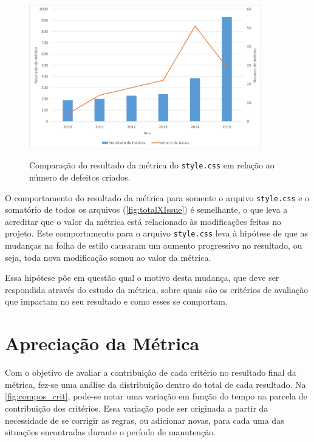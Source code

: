 \begin{figure}[!htb]
	\centering
	\caption{Comparação do resultado da métrica do \texttt{style.css} em relação ao número de defeitos criados.}
	\includegraphics[width=0.9\textwidth]{./04-figuras/style_issues}
	\label{fig:styleXIssues}
\end{figure}

O comportamento do resultado da métrica para somente o arquivo \texttt{style.css} e o somatório de todos os arquivos (\autoref{fig:totalXIssue}) é semelhante, o que leva a acreditar que o valor da métrica está relacionado às modificações feitas no projeto. Este comportamento para o arquivo \texttt{style.css} leva à hipótese de que as mudanças na folha de estilo causaram um aumento progressivo no resultado, ou seja, toda nova modificação somou ao valor da métrica.

Essa hipótese põe em questão qual o motivo desta mudança, que deve ser respondida através do estudo da métrica, sobre quais são os critérios de avaliação que impactam no seu resultado e como esses se comportam. 

\section{Apreciação da Métrica}

Com o objetivo de avaliar a contribuição de cada critério no resultado final da métrica, fez-se uma análise da distribuição dentro do total de cada resultado. Na \autoref{fig:compos_crit}, pode-se notar uma variação em função do tempo na parcela de contribuição dos critérios. Essa variação pode ser originada a partir da necessidade de se corrigir as regras, ou adicionar novas, para cada uma das situações encontradas durante o período de manutenção.


